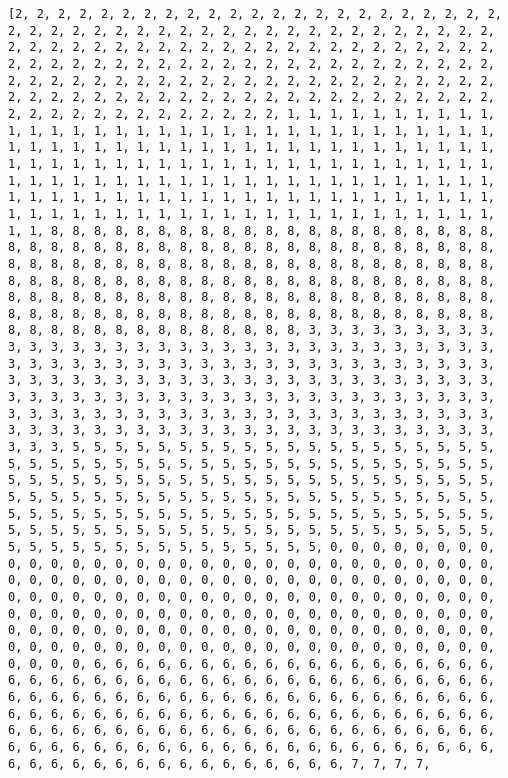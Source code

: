 \documentclass[11pt]{article}
\begin{document}
    \begin{Verbatim}[commandchars=\\\{\}]
[2, 2, 2, 2, 2, 2, 2, 2, 2, 2, 2, 2, 2, 2, 2, 2, 2, 2, 2, 2, 2, 2, 2, 2, 2, 2, 2, 2, 2, 2, 2, 2, 2, 2, 2, 2, 2, 2, 2, 2, 2, 2, 2, 2, 2, 2, 2, 2, 2, 2, 2, 2, 2, 2, 2, 2, 2, 2, 2, 2, 2, 2, 2, 2, 2, 2, 2, 2, 2, 2, 2, 2, 2, 2, 2, 2, 2, 2, 2, 2, 2, 2, 2, 2, 2, 2, 2, 2, 2, 2, 2, 2, 2, 2, 2, 2, 2, 2, 2, 2, 2, 2, 2, 2, 2, 2, 2, 2, 2, 2, 2, 2, 2, 2, 2, 2, 2, 2, 2, 2, 2, 2, 2, 2, 2, 2, 2, 2, 2, 2, 2, 2, 2, 2, 2, 2, 2, 2, 2, 2, 2, 2, 2, 2, 2, 2, 2, 2, 2, 2, 2, 1, 1, 1, 1, 1, 1, 1, 1, 1, 1, 1, 1, 1, 1, 1, 1, 1, 1, 1, 1, 1, 1, 1, 1, 1, 1, 1, 1, 1, 1, 1, 1, 1, 1, 1, 1, 1, 1, 1, 1, 1, 1, 1, 1, 1, 1, 1, 1, 1, 1, 1, 1, 1, 1, 1, 1, 1, 1, 1, 1, 1, 1, 1, 1, 1, 1, 1, 1, 1, 1, 1, 1, 1, 1, 1, 1, 1, 1, 1, 1, 1, 1, 1, 1, 1, 1, 1, 1, 1, 1, 1, 1, 1, 1, 1, 1, 1, 1, 1, 1, 1, 1, 1, 1, 1, 1, 1, 1, 1, 1, 1, 1, 1, 1, 1, 1, 1, 1, 1, 1, 1, 1, 1, 1, 1, 1, 1, 1, 1, 1, 1, 1, 1, 1, 1, 1, 1, 1, 1, 1, 1, 1, 1, 1, 1, 1, 1, 1, 1, 1, 8, 8, 8, 8, 8, 8, 8, 8, 8, 8, 8, 8, 8, 8, 8, 8, 8, 8, 8, 8, 8, 8, 8, 8, 8, 8, 8, 8, 8, 8, 8, 8, 8, 8, 8, 8, 8, 8, 8, 8, 8, 8, 8, 8, 8, 8, 8, 8, 8, 8, 8, 8, 8, 8, 8, 8, 8, 8, 8, 8, 8, 8, 8, 8, 8, 8, 8, 8, 8, 8, 8, 8, 8, 8, 8, 8, 8, 8, 8, 8, 8, 8, 8, 8, 8, 8, 8, 8, 8, 8, 8, 8, 8, 8, 8, 8, 8, 8, 8, 8, 8, 8, 8, 8, 8, 8, 8, 8, 8, 8, 8, 8, 8, 8, 8, 8, 8, 8, 8, 8, 8, 8, 8, 8, 8, 8, 8, 8, 8, 8, 8, 8, 8, 8, 8, 8, 8, 8, 8, 8, 8, 8, 8, 8, 8, 8, 8, 8, 8, 8, 3, 3, 3, 3, 3, 3, 3, 3, 3, 3, 3, 3, 3, 3, 3, 3, 3, 3, 3, 3, 3, 3, 3, 3, 3, 3, 3, 3, 3, 3, 3, 3, 3, 3, 3, 3, 3, 3, 3, 3, 3, 3, 3, 3, 3, 3, 3, 3, 3, 3, 3, 3, 3, 3, 3, 3, 3, 3, 3, 3, 3, 3, 3, 3, 3, 3, 3, 3, 3, 3, 3, 3, 3, 3, 3, 3, 3, 3, 3, 3, 3, 3, 3, 3, 3, 3, 3, 3, 3, 3, 3, 3, 3, 3, 3, 3, 3, 3, 3, 3, 3, 3, 3, 3, 3, 3, 3, 3, 3, 3, 3, 3, 3, 3, 3, 3, 3, 3, 3, 3, 3, 3, 3, 3, 3, 3, 3, 3, 3, 3, 3, 3, 3, 3, 3, 3, 3, 3, 3, 3, 3, 3, 3, 3, 3, 3, 3, 3, 3, 3, 5, 5, 5, 5, 5, 5, 5, 5, 5, 5, 5, 5, 5, 5, 5, 5, 5, 5, 5, 5, 5, 5, 5, 5, 5, 5, 5, 5, 5, 5, 5, 5, 5, 5, 5, 5, 5, 5, 5, 5, 5, 5, 5, 5, 5, 5, 5, 5, 5, 5, 5, 5, 5, 5, 5, 5, 5, 5, 5, 5, 5, 5, 5, 5, 5, 5, 5, 5, 5, 5, 5, 5, 5, 5, 5, 5, 5, 5, 5, 5, 5, 5, 5, 5, 5, 5, 5, 5, 5, 5, 5, 5, 5, 5, 5, 5, 5, 5, 5, 5, 5, 5, 5, 5, 5, 5, 5, 5, 5, 5, 5, 5, 5, 5, 5, 5, 5, 5, 5, 5, 5, 5, 5, 5, 5, 5, 5, 5, 5, 5, 5, 5, 5, 5, 5, 5, 5, 5, 5, 5, 5, 5, 5, 5, 5, 5, 5, 5, 5, 5, 0, 0, 0, 0, 0, 0, 0, 0, 0, 0, 0, 0, 0, 0, 0, 0, 0, 0, 0, 0, 0, 0, 0, 0, 0, 0, 0, 0, 0, 0, 0, 0, 0, 0, 0, 0, 0, 0, 0, 0, 0, 0, 0, 0, 0, 0, 0, 0, 0, 0, 0, 0, 0, 0, 0, 0, 0, 0, 0, 0, 0, 0, 0, 0, 0, 0, 0, 0, 0, 0, 0, 0, 0, 0, 0, 0, 0, 0, 0, 0, 0, 0, 0, 0, 0, 0, 0, 0, 0, 0, 0, 0, 0, 0, 0, 0, 0, 0, 0, 0, 0, 0, 0, 0, 0, 0, 0, 0, 0, 0, 0, 0, 0, 0, 0, 0, 0, 0, 0, 0, 0, 0, 0, 0, 0, 0, 0, 0, 0, 0, 0, 0, 0, 0, 0, 0, 0, 0, 0, 0, 0, 0, 0, 0, 0, 0, 0, 0, 0, 0, 6, 6, 6, 6, 6, 6, 6, 6, 6, 6, 6, 6, 6, 6, 6, 6, 6, 6, 6, 6, 6, 6, 6, 6, 6, 6, 6, 6, 6, 6, 6, 6, 6, 6, 6, 6, 6, 6, 6, 6, 6, 6, 6, 6, 6, 6, 6, 6, 6, 6, 6, 6, 6, 6, 6, 6, 6, 6, 6, 6, 6, 6, 6, 6, 6, 6, 6, 6, 6, 6, 6, 6, 6, 6, 6, 6, 6, 6, 6, 6, 6, 6, 6, 6, 6, 6, 6, 6, 6, 6, 6, 6, 6, 6, 6, 6, 6, 6, 6, 6, 6, 6, 6, 6, 6, 6, 6, 6, 6, 6, 6, 6, 6, 6, 6, 6, 6, 6, 6, 6, 6, 6, 6, 6, 6, 6, 6, 6, 6, 6, 6, 6, 6, 6, 6, 6, 6, 6, 6, 6, 6, 6, 6, 6, 6, 6, 6, 6, 6, 6, 7, 7, 7, 7, 
\end{Verbatim}
\end{document}
